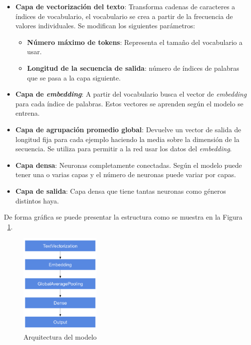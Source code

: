 \documentclass[12pt,a4paper, xcolor=table]{article}
\begin{document}
\begin{itemize}
\item \textbf{Capa de vectorización del texto}: Transforma cadenas de caracteres a índices de vocabulario, el vocabulario se crea a partir de la frecuencia de valores individuales. Se modifican los siguientes parámetros:
\begin{itemize}
\item \textbf{Número máximo de tokens}: Representa el tamaño del vocabulario a usar.
\item \textbf{Longitud de la secuencia de salida}: número de índices de palabras que se pasa a la capa siguiente.
\end{itemize}

\item \textbf{Capa de \textit{embedding}}: A partir del vocabulario busca el vector de \textit{embedding} para cada índice de palabras. Estos vectores se aprenden según el modelo se entrena.

\item \textbf{Capa de agrupación promedio global}: Devuelve un vector de salida de longitud fija para cada ejemplo haciendo la media sobre la dimensión de la secuencia. Se utiliza para permitir a la red usar los datos del \textit{embedding}.

\item \textbf{Capa densa}: Neuronas completamente conectadas. Según el modelo puede tener una o varias capas y el número de neuronas puede variar por capas.

\item \textbf{Capa de salida}: Capa densa que tiene tantas neuronas como géneros distintos haya.

\end{itemize}

De forma gráfica se puede presentar la estructura como se muestra en la Figura ~\ref{fig:arqui}.

  \begin{figure}[!h]
    \centering
    \includegraphics[width=150px]{img/Arquitectura.png}
    \caption{Arquitectura del modelo}
    \label{fig:arqui}
  \end{figure}
\end{document}
